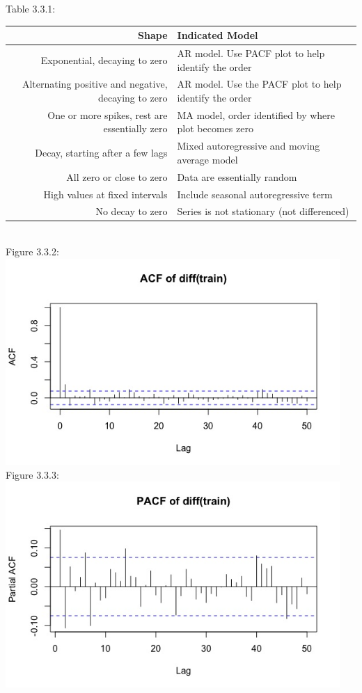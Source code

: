 \documentclass[12pt]{article}
\begin{document}
\begin{center}
  Table 3.3.1:\\
  \begin{tabular}{r|l}
    \hline
    Shape & Indicated Model \\ \hline
    Exponential, decaying to zero & AR model. Use PACF plot to help identify the order \\ \hline
    Alternating positive and negative, decaying to zero & AR model. Use the PACF plot to help identify the order \\ \hline
    One or more spikes, rest are essentially zero & MA model, order identified by where plot becomes zero \\ \hline
    Decay, starting after a few lags & Mixed autoregressive and moving average model \\ \hline
    All zero or close to zero & Data are essentially random \\ \hline
    High values at fixed intervals & Include seasonal autoregressive term \\ \hline
    No decay to zero & Series is not stationary (not differenced) \\ \hline
  \end{tabular}\\

  Figure 3.3.2:\\
  \includegraphics[width=5in]{plots/ts_plot2.jpeg}\\

  Figure 3.3.3:\\
  \includegraphics[width=5in]{plots/ts_plot3.jpeg}\\


\end{center}
\end{document}
